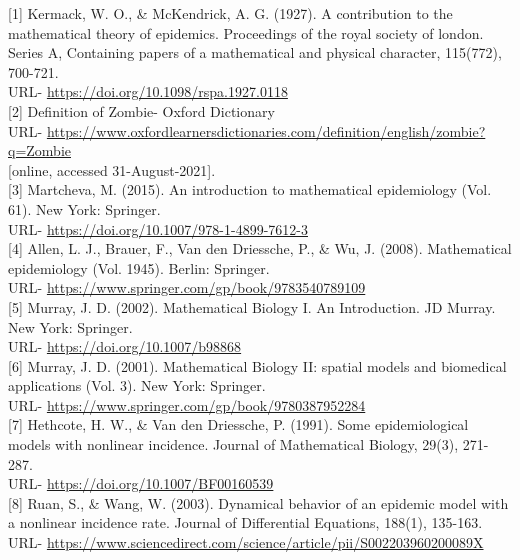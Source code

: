 \fancyhead[CE, CO]{\leftmark}
\setlength\parindent{0pt}
[1] Kermack, W. O., \& McKendrick, A. G. (1927). A contribution to the mathematical theory of epidemics. Proceedings of the royal society of london. Series A, Containing papers of a mathematical and physical character, 115(772), 700-721. \\
URL- \url{https://doi.org/10.1098/rspa.1927.0118} \\

[2] Definition of Zombie- Oxford Dictionary \\
URL- \url{https://www.oxfordlearnersdictionaries.com/definition/english/zombie?q=Zombie} \\
{[online, accessed 31-August-2021]}. \\

[3] Martcheva, M. (2015). An introduction to mathematical epidemiology (Vol. 61). New York: Springer. \\
URL- \url{https://doi.org/10.1007/978-1-4899-7612-3} \\

[4] Allen, L. J., Brauer, F., Van den Driessche, P., \& Wu, J. (2008). Mathematical epidemiology (Vol. 1945). Berlin: Springer. \\
URL- \url{https://www.springer.com/gp/book/9783540789109} \\

[5] Murray, J. D. (2002). Mathematical Biology I. An Introduction. JD Murray. New York: Springer. \\
URL- \url{https://doi.org/10.1007/b98868} \\

[6] Murray, J. D. (2001). Mathematical Biology II: spatial models and biomedical applications (Vol. 3). New York: Springer. \\
URL- \url{https://www.springer.com/gp/book/9780387952284} \\

[7] Hethcote, H. W., \& Van den Driessche, P. (1991). Some epidemiological models with nonlinear incidence. Journal of Mathematical Biology, 29(3), 271-287. \\
URL- \url{https://doi.org/10.1007/BF00160539} \\

[8] Ruan, S., \& Wang, W. (2003). Dynamical behavior of an epidemic model with a nonlinear incidence rate. Journal of Differential Equations, 188(1), 135-163. \\
URL- \url{https://www.sciencedirect.com/science/article/pii/S002203960200089X} \\

